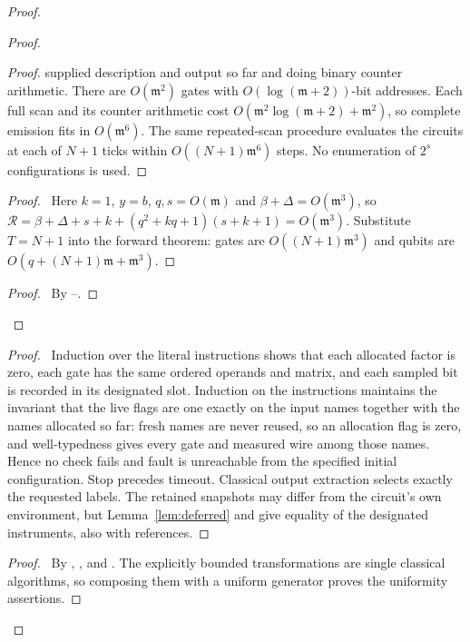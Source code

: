 \begin{proof}
\begin{proof}
\begin{proof}
 supplied description and output so far and doing binary counter
 arithmetic. There are $O({\mathfrak m}^2)$ gates with
 $O(\log({\mathfrak m}+2))$-bit addresses. Each full scan and its counter
 arithmetic cost $O({\mathfrak m}^2\log({\mathfrak m}+2)+{\mathfrak m}^2)$, so complete emission
 fits in $O({\mathfrak m}^6)$. The same repeated-scan procedure evaluates the
 circuits at each of $N+1$ ticks within $O((N+1){\mathfrak m}^6)$ steps.
 No enumeration of $2^s$ configurations is used.\end{proof}
 \begin{proof}\pf\ Here $k=1$, $y=b$, $q,s=O({\mathfrak m})$ and
 $\beta+\Delta=O({\mathfrak m}^3)$, so
 $\mathcal R=\beta+\Delta+s+k+(q^2+kq+1)(s+k+1)=O({\mathfrak m}^3)$.
 Substitute $T=N+1$ into the forward theorem: gates are
 $O((N+1){\mathfrak m}^3)$ and qubits are $O(q+(N+1){\mathfrak m}+{\mathfrak m}^3)$.\end{proof}
 \qedstep
 \begin{proof}\pf\ By --.
 \end{proof}
\end{proof}
 \begin{proof}\pf\ Induction over the literal instructions shows
 that each allocated factor is zero, each gate has the same ordered
 operands and matrix, and each sampled bit is recorded in its
 designated slot. Induction on the instructions maintains the invariant that the live flags are one exactly on the input names together with the names allocated so far: fresh names are never reused, so an allocation flag is zero, and well-typedness gives every gate and measured wire among those names. Hence no check fails and fault is unreachable from the specified initial configuration. Stop precedes timeout. Classical
 output extraction selects exactly the requested labels. The
 retained snapshots may differ from the circuit's own environment,
 but Lemma~\ref{lem:deferred} and  give equality
 of the designated instruments, also with references.\end{proof}
 \qedstep
 \begin{proof}\pf\ By ,
 , and .
 The explicitly bounded transformations are single classical
 algorithms, so composing them with a uniform generator proves
 the uniformity assertions.\end{proof}
\end{proof}

